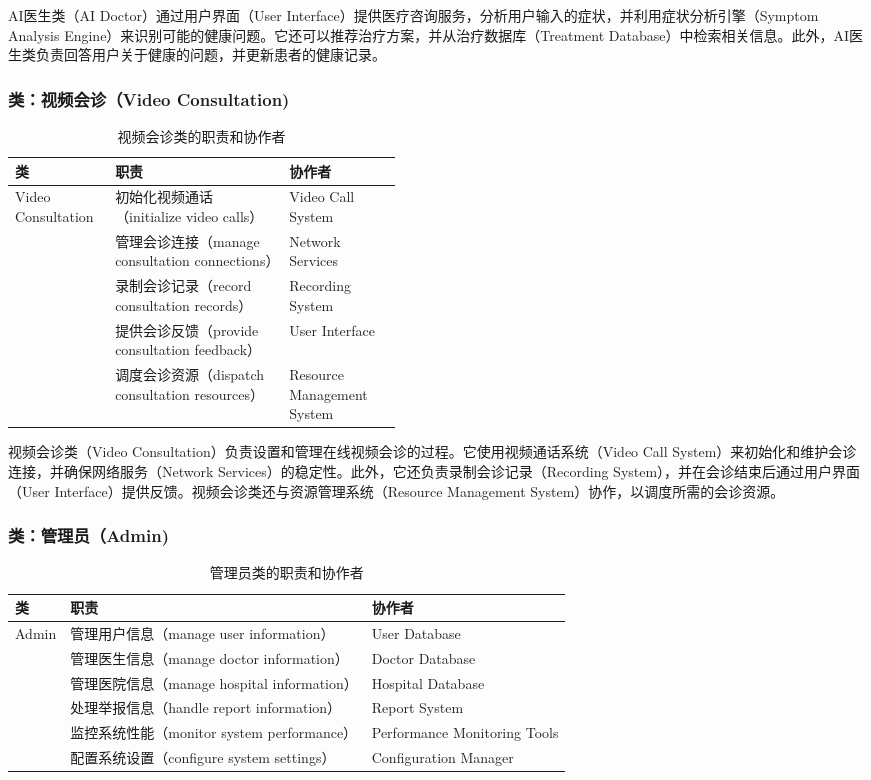 AI医生类（AI Doctor）通过用户界面（User Interface）提供医疗咨询服务，分析用户输入的症状，并利用症状分析引擎（Symptom Analysis Engine）来识别可能的健康问题。它还可以推荐治疗方案，并从治疗数据库（Treatment Database）中检索相关信息。此外，AI医生类负责回答用户关于健康的问题，并更新患者的健康记录。

\subsubsection{类：视频会诊（Video Consultation)}
\begin{table}[htbp]
	\centering
	\begin{tabular}{|l|p{0.45\linewidth}|l|}
		\hline
		\textbf{类} & \textbf{职责} & \textbf{协作者} \\
		\hline
		Video Consultation & 初始化视频通话（initialize video calls） & Video Call System \\
		& 管理会诊连接（manage consultation connections） & Network Services \\
		& 录制会诊记录（record consultation records） & Recording System \\
		& 提供会诊反馈（provide consultation feedback） & User Interface \\
		& 调度会诊资源（dispatch consultation resources） & Resource Management System \\
		\hline
	\end{tabular}
	\caption{视频会诊类的职责和协作者}
	\label{tab:video_consultation}
\end{table}

视频会诊类（Video Consultation）负责设置和管理在线视频会诊的过程。它使用视频通话系统（Video Call System）来初始化和维护会诊连接，并确保网络服务（Network Services）的稳定性。此外，它还负责录制会诊记录（Recording System），并在会诊结束后通过用户界面（User Interface）提供反馈。视频会诊类还与资源管理系统（Resource Management System）协作，以调度所需的会诊资源。

\subsubsection{类：管理员（Admin)}
\begin{table}[htbp]
	\centering
	\begin{tabular}{|l|l|l|}
		\hline
		\textbf{类} & \textbf{职责} & \textbf{协作者} \\
		\hline
		Admin & 管理用户信息（manage user information） & User Database \\
		& 管理医生信息（manage doctor information） & Doctor Database \\
		& 管理医院信息（manage hospital information） & Hospital Database \\
		& 处理举报信息（handle report information） & Report System \\
		& 监控系统性能（monitor system performance） & Performance Monitoring Tools \\
		& 配置系统设置（configure system settings） & Configuration Manager \\
		\hline
	\end{tabular}
	\caption{管理员类的职责和协作者}
	\label{tab:admin}
\end{table}

